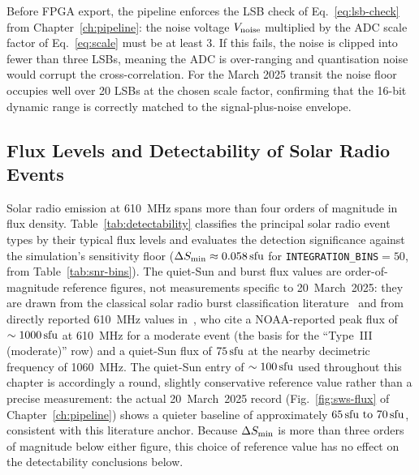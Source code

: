 Before FPGA export, the pipeline enforces the LSB check of
Eq.~\eqref{eq:lsb-check} from Chapter~\ref{ch:pipeline}: the noise voltage
$V_{\rm noise}$ multiplied by the ADC scale factor of Eq.~\eqref{eq:scale} must be
at least 3. If this fails, the noise is clipped
into fewer than three LSBs, meaning the ADC is over-ranging and quantisation
noise would corrupt the cross-correlation. For the March 2025 transit the noise
floor occupies well over 20 LSBs at the chosen scale factor, confirming that the
16-bit dynamic range is correctly matched to the signal-plus-noise envelope.

\subsection{Flux Levels and Detectability of Solar Radio Events}
\label{sec:detectability}

Solar radio emission at \SI{610}{\mega\hertz} spans more than four orders of
magnitude in flux density. Table~\ref{tab:detectability} classifies the principal
solar radio event types by their typical flux levels and evaluates the
detection significance against the simulation's sensitivity floor
($\Delta S_{\rm min}\approx\SI{0.058}{\mathrm{sfu}}$ for \texttt{INTEGRATION\_BINS}$=50$,
from Table~\ref{tab:snr-bins}). The quiet-Sun and burst flux values are
order-of-magnitude reference figures, not measurements specific to 20~March~2025:
they are drawn from the classical solar radio burst classification
literature~\citep{wild1963,dulk1985,mclean1985} and from directly reported
610~MHz values in~\citet{marque2018}, who cite a NOAA-reported peak flux of
$\sim\SI{1000}{\mathrm{sfu}}$ at \SI{610}{\mega\hertz} for a moderate event (the basis
for the ``Type~III (moderate)'' row) and a quiet-Sun flux of $\SI{75}{\mathrm{sfu}}$ at
the nearby decimetric frequency of \SI{1060}{\mega\hertz}. The quiet-Sun entry
of $\sim\SI{100}{\mathrm{sfu}}$ used throughout this chapter is accordingly a round,
slightly conservative reference value rather than a precise measurement: the
actual 20~March~2025 record (Fig.~\ref{fig:sws-flux} of Chapter~\ref{ch:pipeline})
shows a quieter baseline of approximately $\SIrange{65}{70}{\sfu}$, consistent with
this literature anchor. Because $\Delta S_{\rm min}$ is more than three orders of
magnitude below either figure, this choice of reference value has no effect on
the detectability conclusions below.


